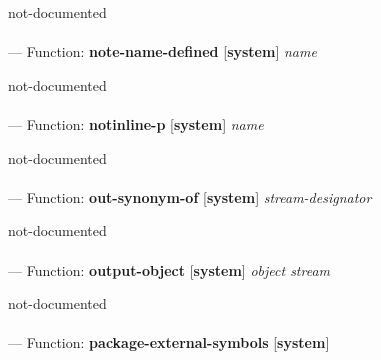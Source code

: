 \begin{adjustwidth}{5em}{5em}
not-documented
\end{adjustwidth}

\paragraph{}
\label{SYSTEM:NOTE-NAME-DEFINED}
--- Function: \textbf{note-name-defined} [\textbf{system}] \textit{name}

\begin{adjustwidth}{5em}{5em}
not-documented
\end{adjustwidth}

\paragraph{}
\label{SYSTEM:NOTINLINE-P}
--- Function: \textbf{notinline-p} [\textbf{system}] \textit{name}

\begin{adjustwidth}{5em}{5em}
not-documented
\end{adjustwidth}

\paragraph{}
\label{SYSTEM:OUT-SYNONYM-OF}
--- Function: \textbf{out-synonym-of} [\textbf{system}] \textit{stream-designator}

\begin{adjustwidth}{5em}{5em}
not-documented
\end{adjustwidth}

\paragraph{}
\label{SYSTEM:OUTPUT-OBJECT}
--- Function: \textbf{output-object} [\textbf{system}] \textit{object stream}

\begin{adjustwidth}{5em}{5em}
not-documented
\end{adjustwidth}

\paragraph{}
\label{SYSTEM:PACKAGE-EXTERNAL-SYMBOLS}
--- Function: \textbf{package-external-symbols} [\textbf{system}] \textit{}

